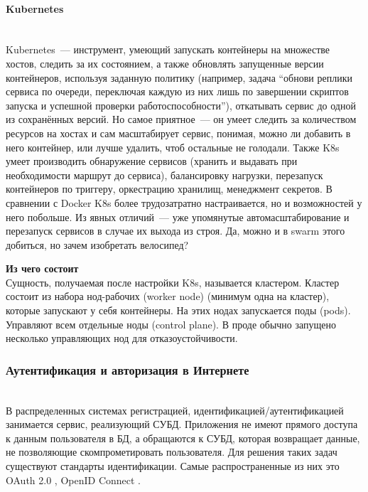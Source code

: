 \paragraph{Kubernetes} ~\\
    Kubernetes~--- инструмент, умеющий запускать контейнеры на множестве хостов, следить за их состоянием, а также обновлять запущенные версии контейнеров, используя заданную политику (например, задача ``обнови реплики сервиса по очереди, переключая каждую из них лишь по завершении
    скриптов запуска и успешной проверки работоспособности''), откатывать сервис до одной из сохранённых версий. Но самое приятное~--- он умеет следить за количеством ресурсов на хостах и сам масштабирует сервис, понимая, можно ли добавить в него контейнер, или лучше удалить,
    чтоб остальные не голодали. Также K8s умеет производить обнаружение сервисов (хранить и выдавать при необходимости маршрут до сервиса), балансировку нагрузки, перезапуск контейнеров по триггеру, оркестрацию хранилищ, менеджмент секретов. В сравнении с Docker K8s более трудозатратно настраивается, но и возможностей у него побольше.
    Из явных отличий~--- уже упомянутые автомасштабирование и перезапуск сервисов в случае их выхода из строя. Да, можно и в swarm этого добиться, но зачем изобретать велосипед?

    \textbf{Из чего состоит} ~\\
    Сущность, получаемая после настройки K8s, называется кластером. Кластер состоит из набора нод-рабочих (worker node) (минимум одна на кластер), которые запускают у себя контейнеры. На этих нодах запускается поды (pods). Управляют всем отдельные ноды (control plane). В проде обычно запущено несколько управляющих нод для отказоустойчивости. \autocite{KuberComponents}

\subsubsection{Аутентификация и авторизация в Интернете}~\\
В распределенных системах регистрацией, идентификацией/аутентификацией занимается
сервис, реализующий СУБД. Приложения не имеют прямого доступа к данным
пользователя в БД, а обращаются к СУБД, которая возвращает данные, не позволяющие
скомпрометировать пользователя. Для решения таких задач существуют стандарты
идентификации. Самые распространенные из них это OAuth 2.0 \autocite{OAuth2.0}, OpenID Connect \autocite{OpenIDConnect}.~\\

